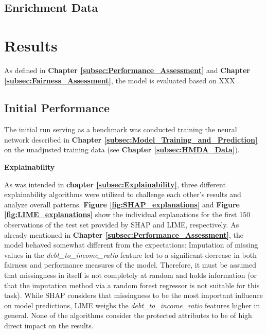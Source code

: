 \subsection{Enrichment Data}\label{subsec:Enrichment_Data}


\section{Results}\label{sec:Results}        

As defined in \textbf{Chapter \ref{subsec:Performance_Assessment}} and \textbf{Chapter \ref{subsec:Fairness_Assessment}}, the model is evaluated based on XXX



\subsection{Initial Performance}\label{subsec:Initial_Performance}

The initial run serving as a benchmark was conducted training the neural network described in \textbf{Chapter \ref{subsec:Model_Training_and_Prediction}} on the unadjusted training data (see \textbf{Chapter \ref{subsec:HMDA_Data}}).

\textbf{Explainability}

As was intended in \textbf{chapter \ref{subsec:Explainability}}, three different explainability algorithms were utilized to challenge each other's results and analyze overall patterns. \textbf{Figure \ref{fig:SHAP_explanations}} and \textbf{Figure \ref{fig:LIME_explanations}} show the individual explanations for the first 150 observations of the test set provided by SHAP and LIME, respectively. 
As already mentioned in \textbf{Chapter \ref{subsec:Performance_Assessment}}, the model behaved somewhat different from the expectations: Imputation of missing values in the \textit{debt\_to\_income\_ratio} feature led to a significant decrease in both fairness and performance measures of the model.
Therefore, it must be assumed that missingness in itself is not completely at random and holds information (or that the imputation method via a random forest regressor is not suitable for this task).
While SHAP considers that missingness to be the most important influence on model predictions, LIME weighs the \textit{debt\_to\_income\_ratio} features higher in general.
None of the algorithms consider the protected attributes to be of high direct impact on the results.

